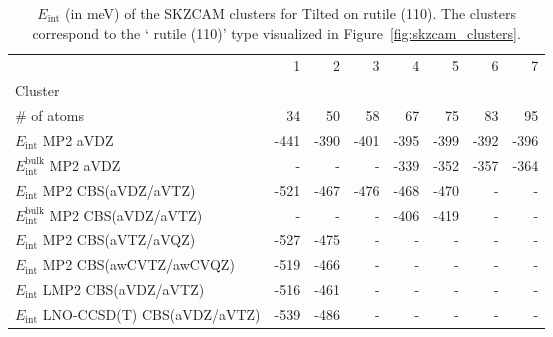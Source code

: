 \begin{table}
\caption{\label{tab:system_eint_r-tio2_co2_tilted}$E_\textrm{int}$ (in meV) of the SKZCAM clusters for Tilted  on  rutile (110). The clusters correspond to the ` rutile (110)' type visualized in Figure~\ref{fig:skzcam_clusters}.}
\begin{adjustbox}{center,max width=1.4\textwidth}
\begin{tabular}{lrrrrrrr}
\toprule
 & 1 & 2 & 3 & 4 & 5 & 6 & 7 \\ 
Cluster &  &  &  &  &  &  &  \\
\midrule
\# of atoms & 34 & 50 & 58 & 67 & 75 & 83 & 95 \\
$E_\textrm{int}$ MP2 aVDZ & -441 & -390 & -401 & -395 & -399 & -392 & -396 \\
$E_\textrm{int}^\textrm{bulk}$ MP2 aVDZ & - & - & - & -339 & -352 & -357 & -364 \\
$E_\textrm{int}$ MP2 CBS(aVDZ/aVTZ) & -521 & -467 & -476 & -468 & -470 & - & - \\
$E_\textrm{int}^\textrm{bulk}$ MP2 CBS(aVDZ/aVTZ) & - & - & - & -406 & -419 & - & - \\
$E_\textrm{int}$ MP2 CBS(aVTZ/aVQZ) & -527 & -475 & - & - & - & - & - \\
$E_\textrm{int}$ MP2 CBS(awCVTZ/awCVQZ) & -519 & -466 & - & - & - & - & - \\
$E_\textrm{int}$ LMP2 CBS(aVDZ/aVTZ) & -516 & -461 & - & - & - & - & - \\
$E_\textrm{int}$ LNO-CCSD(T) CBS(aVDZ/aVTZ) & -539 & -486 & - & - & - & - & - \\
\bottomrule
\end{tabular}
\end{adjustbox}
\end{table}

